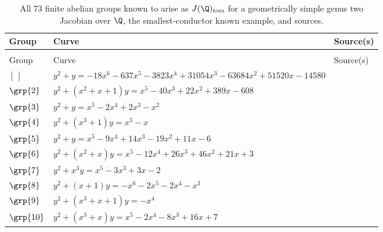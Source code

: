 \begingroup\scriptsize
\renewcommand{\arraystretch}{1.18}
\begin{longtable}{@{}>{\raggedright\arraybackslash}p{1.35cm}
 >{\raggedright\arraybackslash}p{}
 >{\raggedright\arraybackslash}p{1.1cm}@{}}
\caption{All 73 finite abelian groups known to arise as $J(\Q)_{\mathrm{tors}}$ for a geometrically simple genus two Jacobian over \(\Q\), the
smallest-conductor known example, and sources.\label{tab:census}}\\
\toprule
Group & Curve & Source(s)\\
\midrule
\endfirsthead
\multicolumn{3}{@{}l}{{\normalsize\emph{Table~\ref{tab:census} (continued)}}}\\
\toprule
Group & Curve & Source(s)\\
\midrule
\endhead
\midrule
\endfoot
\bottomrule
\endlastfoot
$[\,]$ & \href{https://alpha.lmfdb.org/Genus2Curve/Q/?jump=[[-14580,51520,-63684,31054,-3823,-637,-18],[1]]}{$y^2 + y = -18x^{6}-637x^{5}-3823x^{4}+31054x^{3}-63684x^{2}+51520x-14580$} & \cite{BSSVY}\\
$\grp{2}$ & \href{https://www.lmfdb.org/Genus2Curve/Q/295/a/295/2}{$y^2 + (x^{2}+x+1)y = x^{5}-40x^{3}+22x^{2}+389x-608$} & \cite{BSSVY}\\
$\grp{3}$ & \href{https://www.lmfdb.org/Genus2Curve/Q/997/b/997/1}{$y^2 + y = x^{5}-2x^{4}+2x^{3}-x^{2}$} & \cite{BSSVY}\\
$\grp{4}$ & \href{https://www.lmfdb.org/Genus2Curve/Q/1070/a/2140/1}{$y^2 + (x^{3}+1)y = x^{3}-x$} & \cite{BSSVY}\\
$\grp{5}$ & \href{https://www.lmfdb.org/Genus2Curve/Q/277/a/277/2}{$y^2 + y = x^{5}-9x^{4}+14x^{3}-19x^{2}+11x-6$} & \cite{Ogg1973}\\
$\grp{6}$ & \href{https://www.lmfdb.org/Genus2Curve/Q/1038/a/1038/1}{$y^2 + (x^{2}+x)y = x^{5}-12x^{4}+26x^{3}+46x^{2}+21x+3$} & \cite{Flynn1991}\\
$\grp{7}$ & \href{https://www.lmfdb.org/Genus2Curve/Q/461/a/461/1}{$y^2 + x^{3}y = x^{5}-3x^{3}+3x-2$} & \cite{Ogg1973}\\
$\grp{8}$ & \href{https://www.lmfdb.org/Genus2Curve/Q/464/a/464/1}{$y^2 + (x+1)y = -x^{6}-2x^{5}-2x^{4}-x^{3}$} & \cite{BSSVY}\\
$\grp{9}$ & \href{https://www.lmfdb.org/Genus2Curve/Q/713/b/713/1}{$y^2 + (x^{3}+x+1)y = -x^{4}$} & \cite{Flynn1991}\\
$\grp{10}$ & \href{https://www.lmfdb.org/Genus2Curve/Q/389/a/389/1}{$y^2 + (x^{3}+x)y = x^{5}-2x^{4}-8x^{3}+16x+7$} & \cite{Flynn1991}\\

\end{longtable}
